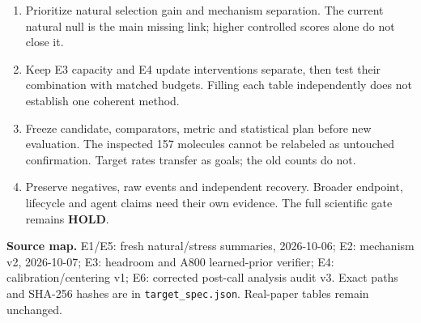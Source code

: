 \documentclass[10pt,letterpaper]{article}
\newcommand{\note}[1]{{\fontsize{8.5}{10.5}\selectfont #1\par}}
\newcommand{\sectionhead}[1]{\vspace{7pt}{\large\bfseries #1}\par\vspace{3pt}}
\begin{document}
\sectionhead{6. What would turn these goals into evidence?}
\begin{enumerate}\setlength{\itemsep}{2pt}
\item Prioritize natural selection gain and mechanism separation. The current natural null is the main missing link; higher controlled scores alone do not close it.
\item Keep E3 capacity and E4 update interventions separate, then test their combination with matched budgets. Filling each table independently does not establish one coherent method.
\item Freeze candidate, comparators, metric and statistical plan before new evaluation. The inspected 157 molecules cannot be relabeled as untouched confirmation. Target rates transfer as goals; the old counts do not.
\item Preserve negatives, raw events and independent recovery. Broader endpoint, lifecycle and agent claims need their own evidence. The full scientific gate remains \textbf{HOLD}.
\end{enumerate}
\note{\textbf{Source map.} E1/E5: fresh natural/stress summaries, 2026-10-06; E2: mechanism v2, 2026-10-07; E3: headroom and A800 learned-prior verifier; E4: calibration/centering v1; E6: corrected post-call analysis audit v3. Exact paths and SHA-256 hashes are in \texttt{target\_spec.json}. Real-paper tables remain unchanged.}
\end{document}
